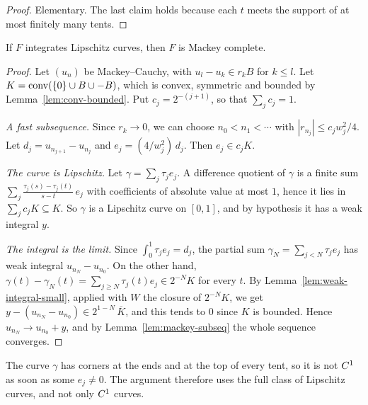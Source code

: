 \begin{proof}
  \leanok
  Elementary. The last claim holds because each $t$ meets the support of at most finitely many
  tents.
\end{proof}

\begin{theorem}
  \label{thm:lipschitz-to-mackey}
  \leanok
  If $F$ integrates Lipschitz curves, then $F$ is Mackey complete.
\end{theorem}

\begin{proof}
  \leanok
  Let $(u_n)$ be Mackey--Cauchy, with $u_l - u_k \in r_k B$ for $k \leq l$. Let
  $K = \operatorname{conv}(\{0\} \cup B \cup -B)$, which is convex, symmetric and bounded by
  Lemma~\ref{lem:conv-bounded}. Put $c_j = 2^{-(j+1)}$, so that $\sum_j c_j = 1$.

  \emph{A fast subsequence.} Since $r_k \to 0$, we can choose $n_0 < n_1 < \cdots$ with
  $|r_{n_j}| \leq c_j w_j^2 / 4$. Let $d_j = u_{n_{j+1}} - u_{n_j}$ and
  $e_j = (4 / w_j^2)\, d_j$. Then $e_j \in c_j K$.

  \emph{The curve is Lipschitz.} Let $\gamma = \sum_j \tau_j e_j$. A difference quotient of
  $\gamma$ is a finite sum $\sum_j \frac{\tau_j(s) - \tau_j(t)}{s - t}\, e_j$ with coefficients
  of absolute value at most $1$, hence it lies in $\sum_j c_j K \subseteq K$. So $\gamma$ is a
  Lipschitz curve on $[0, 1]$, and by hypothesis it has a weak integral $y$.

  \emph{The integral is the limit.} Since $\int_0^1 \tau_j e_j = d_j$, the partial sum
  $\gamma_N = \sum_{j < N} \tau_j e_j$ has weak integral $u_{n_N} - u_{n_0}$. On the other hand,
  $\gamma(t) - \gamma_N(t) = \sum_{j \geq N} \tau_j(t) e_j \in 2^{-N} K$ for every $t$. By
  Lemma~\ref{lem:weak-integral-small}, applied with $W$ the closure of $2^{-N} K$, we get
  $y - (u_{n_N} - u_{n_0}) \in 2^{1-N}\, \overline{K}$, and this tends to $0$ since $K$ is
  bounded. Hence $u_{n_N} \to u_{n_0} + y$, and by Lemma~\ref{lem:mackey-subseq} the whole
  sequence converges.
\end{proof}

\begin{remark}
  The curve $\gamma$ has corners at the ends and at the top of every tent, so it is not
  $C^{1}$ as soon as some $e_j \neq 0$. The argument therefore uses the full class of Lipschitz
  curves, and not only $C^{1}$ curves.
\end{remark}

